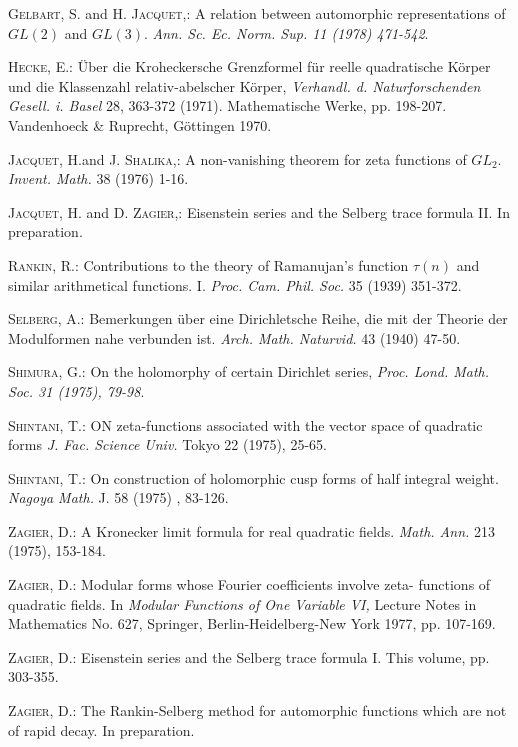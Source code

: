 \begin{thebibliography}{99}
 \textsc{Gelbart, S.} and \textsc{H. Jacquet,:} A relation between automorphic representations of $GL(2)$ and $GL(3)$. \textit{Ann. Sc. Ec. Norm. Sup. 11 (1978) 471-542}.

 \textsc{Hecke, E.:} \"Uber die Kroheckersche Grenzformel f\"ur reelle quadratische K\"orper und die Klassenzahl relativ-abelscher K\"orper, \textit{Verhandl. d. Naturforschenden Gesell. i. Basel} 28, 363-372 (1971). Mathematische Werke, pp. 198-207. Vandenhoeck \& Ruprecht, G\"ottingen 1970.

 \textsc{Jacquet, H.}\pageoriginale and \textsc{J. Shalika},: A non-vanishing theorem for zeta functions of $GL_2$. \textit{Invent. Math.} 38 (1976) 1-16.

 \textsc{Jacquet, H.} and \textsc{D. Zagier,:} Eisenstein series and the Selberg trace formula II. In preparation. 

 \textsc{Rankin, R.:} Contributions to the theory of Ramanujan's function $\tau(n)$ and similar arithmetical functions. I. \textit{Proc. Cam. Phil. Soc.} 35 (1939) 351-372.

 \textsc{Selberg, A.:} Bemerkungen \"uber eine Dirichletsche Reihe, die mit der Theorie der Modulformen nahe verbunden ist. \textit{Arch. Math. Naturvid.} 43 (1940) 47-50.

 \textsc{Shimura, G.:} On the holomorphy of certain Dirichlet series, \textit{Proc. Lond. Math. Soc. 31 (1975), 79-98}.

 \textsc{Shintani, T.:} ON zeta-functions associated with the vector space of quadratic forms \textit{J. Fac. Science Univ.} Tokyo 22 (1975), 25-65.

 \textsc{Shintani, T.:} On construction of holomorphic cusp forms of half integral weight. \textit{Nagoya Math.} J. 58 (1975) , 83-126.

 \textsc{Zagier, D.:} A Kronecker limit formula for real quadratic fields. \textit{Math. Ann.} 213 (1975), 153-184.

 \textsc{Zagier, D.:} Modular forms whose Fourier coefficients involve zeta- functions  of quadratic fields. In \textit{Modular Functions of One Variable VI,} Lecture Notes in Mathematics No. 627, Springer, Berlin-Heidelberg-New York 1977, pp. 107-169.

 \textsc{Zagier, D.:} Eisenstein series and the Selberg trace formula I. This volume, pp. 303-355.

 \textsc{Zagier, D.:} The Rankin-Selberg method for automorphic functions which are not of rapid decay. In preparation.
\end{thebibliography}
